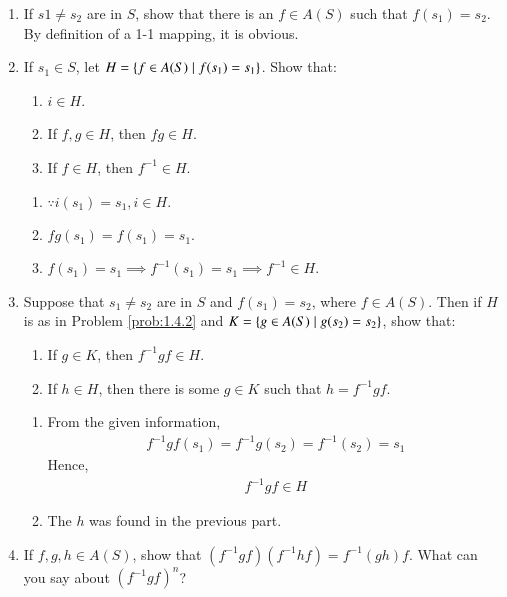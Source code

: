 \renewcommand{\theequation}{\theenumi}

\begin{enumerate}[label=\arabic*.,ref=\thesubsection.\theenumi]

	\item If $s1 \ne s_2$ are in $S$, show that there is an $f \in A(S)$ such that $f(s_1) = s_2$.
		\\
		\solution By definition of a 1-1 mapping, it is obvious.
	\item If $s_1 \in S$, let $H = \left\{f \in A(S) \mid f(s_1) = s_1\right\}$. Show that: 
		\label{prob:1.4.2}
		\begin{enumerate}
		\item  $i \in H$. 
		\item  If $f, g \in H$, then $fg \in H$. 
		\item  If $f \in H$, then $f^{-1} \in H$.
		\end{enumerate}
		\solution 
		\begin{enumerate}
			\item $\because i(s_1) = s_1, i \in H$.
			\item $fg(s_1)= f(s_1) = s_1.$
			\item $f(s_1) = s_1 \implies f^{-1}(s_1) = s_1 \implies f^{-1} \in H$.
		\end{enumerate}
	\item Suppose that $s_1 \ne s_2$ are in $S$ and $f(s_1) = s_2$, where $f \in A (S)$. Then if $H$ is as in Problem
		\ref{prob:1.4.2}
		 and $K = \left\{g \in A (S) \mid g(s_2) = s_2\right\}$, show that:
\begin{enumerate}
	\item  If $g \in K$, then $f^{-1}gf \in H$. 
	\item  If $h \in H$, then there is some $g \in K$ such that $h = f^{-1}gf$.
\end{enumerate}
\solution
\begin{enumerate}
	\item  From the given information,
		\begin{align}
			f^{-1}gf(s_1) =  
			f^{-1}g(s_2) =   
			f^{-1}(s_2) =  s_1 
		\end{align}
		Hence, 
		\begin{align}
			f^{-1}gf  \in H 
		\end{align}
	\item  The $h$ was found in the previous part.
\end{enumerate}
\item If $f, g, h \in A(S)$, show that $(f^{-1}gf)(f^{-1}hf) = f^{-1}(gh)f$. What can you say about $(f^{-1}gf)^n$?

\end{enumerate}

